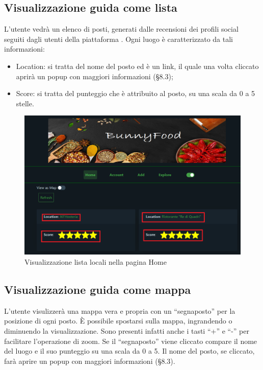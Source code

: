 {    \subsection{Visualizzazione guida come lista} {
        L'utente vedrà un elenco di posti, generati dalle recensioni dei profili social seguiti dagli utenti della piattaforma \platform{}. \aCapo
        Ogni luogo è caratterizzato da tali informazioni: 
        \begin{itemize}
            \item Location: si tratta del nome del posto ed è un link, il quale una volta cliccato aprirà un popup con maggiori informazioni (§8.3); 
            \item Score: si tratta del punteggio che è attribuito al posto, su una scala da 0 a 5 stelle.
        \end{itemize}       
        \begin{figure}[H]
            \includegraphics[width=12cm]{sezioni/images/list-home.png}
            \centering
            \caption{Visualizzazione lista locali nella pagina Home}
        \end{figure}
    }

    \subsection{Visualizzazione guida come mappa} {
        L'utente visulizzerà una mappa vera e propria con un ``segnaposto'' per la posizione di ogni posto. È possibile spostarsi sulla mappa, ingrandendo o diminuendo la visualizzazione. 
        Sono presenti infatti anche i tasti ``+'' e ``-'' per facilitare l'operazione di zoom. \aCapo
        Se il ``segnaposto'' viene cliccato compare il nome del luogo e il suo punteggio su una scala da 0 a 5. Il nome del posto, se cliccato, farà aprire un popup con maggiori informazioni (§8.3).

}}
